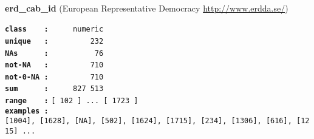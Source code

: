 \documentclass[]{article}
\begin{document}
~

\textbf{erd\_cab\_id} (European Representative Democracy
\url{http://www.erdda.se/})

\textbf{\texttt{class\ \ \ \ :}} \texttt{~~~~~numeric}\\
\textbf{\texttt{unique\ \ \ :}} \texttt{~~~~~~~~~232}\\
\textbf{\texttt{NAs\ \ \ \ \ \ :}} \texttt{~~~~~~~~~~76}\\
\textbf{\texttt{not-NA\ \ \ :}} \texttt{~~~~~~~~~710}\\
\textbf{\texttt{not-0-NA\ :}} \texttt{~~~~~~~~~710}\\
\textbf{\texttt{sum\ \ \ \ \ \ :}} \texttt{~~~~~827~513}\\
\textbf{\texttt{range\ \ \ \ :}}
\texttt{{[}\ 102\ {]}\ ...\ {[}\ 1723\ {]}}\\
\textbf{\texttt{examples\ :}}
\texttt{{[}1004{]},\ {[}1628{]},\ {[}NA{]},\ {[}502{]},\ {[}1624{]},\ {[}1715{]},\ {[}234{]},\ {[}1306{]},\ {[}616{]},\ {[}1215{]}\ ...}\\

~
\end{document}
